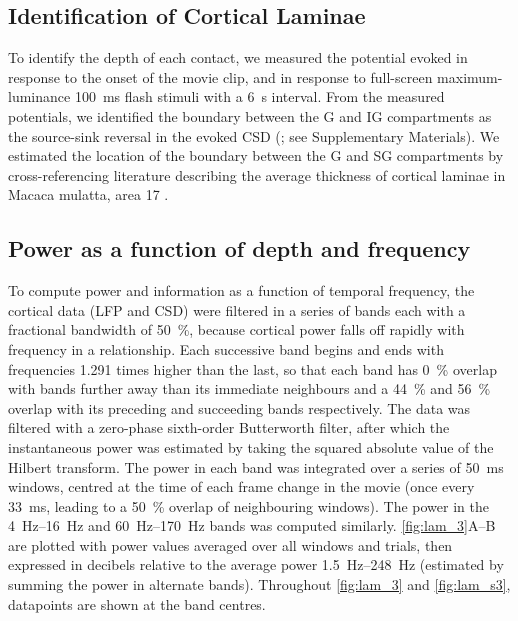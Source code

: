 \subsection{Identification of Cortical Laminae}

To identify the depth of each contact, we measured the potential evoked in response to the onset of the movie clip, and in response to full-screen maximum-luminance \SI{100}{\milli\second} flash stimuli with a \SI{6}{\second} interval.
From the measured potentials, we identified the boundary between the \ac{G} and \ac{IG} compartments as the source-sink reversal in the evoked \ac{CSD} (\citealp{Mitzdorf1979,Mitzdorf1985}; see Supplementary Materials).
We estimated the location of the boundary between the \ac{G} and \ac{SG} compartments by cross-referencing literature describing the average thickness of cortical laminae in Macaca mulatta, area 17 \citep{Lund1973,OKusky1982}.


\subsection{Power as a function of depth and frequency}

To compute power and information as a function of temporal frequency, the cortical data (\ac{LFP} and \ac{CSD}) were filtered in a series of bands each with a fractional bandwidth of \SI{50}{\percent}, because cortical power falls off rapidly with frequency in a  relationship.
Each successive band begins and ends with frequencies 1.291 times higher than the last, so that each band has \SI{0}{\percent} overlap with bands further away than its immediate neighbours and a \SI{44}{\percent} and \SI{56}{\percent} overlap with its preceding and succeeding bands respectively.
The data was filtered with a zero-phase sixth-order Butterworth filter, after which the instantaneous power was estimated by taking the squared absolute value of the Hilbert transform.
The power in each band was integrated over a series of \SI{50}{\milli\second} windows, centred at the time of each frame change in the movie (once every \SI{33}{\milli\second}, leading to a \SI{50}{\percent} overlap of neighbouring windows).
The power in the \SIrange{4}{16}{Hz} and \SIrange{60}{170}{Hz} bands was computed similarly.
\autoref{fig:lam_3}A--B are plotted with power values averaged over all windows and trials, then expressed in decibels relative to the average power \SIrange{1.5}{248}{Hz} (estimated by summing the power in alternate bands).
Throughout \autoref{fig:lam_3} and \autoref{fig:lam_s3}, datapoints are shown at the band centres.


